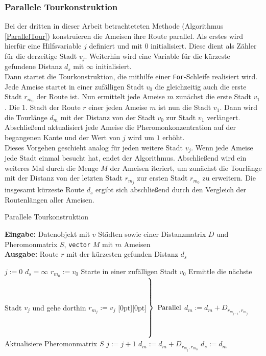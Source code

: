 \documentclass[doktyp=barbeit, sprache=german]{TUBAFarbeiten}
\begin{document}
\subsubsection{Parallele Tourkonstruktion}
Bei der dritten in dieser Arbeit betrachteteten Methode (Algorithmus \ref{ParallelTour}) konstruieren die Ameisen ihre Route parallel.
Als erstes wird hierfür eine Hilfsvariable $j$ definiert und mit $0$ initialisiert. Diese dient als Zähler für die derzeitige Stadt $v_j$. Weiterhin wird eine Variable für die kürzeste gefundene Distanz $d_s$ mit $\infty$ initialisiert. \\Dann startet die Tourkonstruktion, die mithilfe einer \texttt{For}-Schleife realisiert wird. Jede Ameise startet in einer zufälligen Stadt $v_0$ die gleichzeitig auch die erste Stadt $r_{m_0}$ der Route ist. Nun ermittelt jede Ameise $m$ zunächst die erste Stadt $v_1$. Die 1. Stadt der Route $r$ einer jeden Ameise $m$ ist nun die Stadt $v_1$. Dann wird die Tourlänge $d_m$ mit der Distanz von der Stadt $v_0$ zur Stadt $v_1$ verlängert. Abschließend aktualisiert jede Ameise die Pheromonkonzentration auf der begangenen Kante und der Wert von $j$ wird um $1$ erhöht.
\\Dieses Vorgehen geschieht analog für jeden weitere Stadt $v_j$. Wenn jede Ameise jede Stadt einmal besucht hat, endet der Algorithmus. Abschließend wird ein weiteres Mal durch die Menge $M$ der Ameisen iteriert, um zunächst die Tourlänge mit der Distanz von der letzten Stadt $r_{m_j}$ zur ersten Stadt $r_{m_0}$ zu erweitern. Die insgesamt kürzeste Route $d_s$ ergibt sich abschließend durch den Vergleich der Routenlängen aller Ameisen.
\begin{algorithm}
\caption{Parallele Tourkonstruktion}
\label{ParallelTour}
\textbf{Eingabe:} Datenobjekt mit $v$ Städten sowie einer Distanzmatrix $D$ und Pheromonmatrix $S$, \texttt{vector} $M$ mit $m$ Ameisen
\\\textbf{Ausgabe:} Route $r$ mit der kürzesten gefunden Distanz $d_s$
\begin{algorithmic}[1]
\State $j := 0$
\State $d_s = \infty$
\State $r_{m_0} := v_0$
\EndIf
\State Starte in einer zufälligen Stadt $v_0$
\State Ermittle die nächste Stadt $v_j$ und gehe dorthin
\State $r_{m_j} := v_j$
\hspace{17em}\raisebox{1.3\baselineskip}[0pt][0pt]{$\left.\rule{0pt}{3.8\baselineskip}\right\}\ \mbox{Parallel}$}
\State $d_m := d_m + D_{r_{m_{j-1}},r_{m_j}}$
\State Aktualisiere Pheromonmatrix $S$
\EndFor
\State $j := j + 1$
\EndWhile
{} 
\State $d_m := d_m + D_{r_{m_j},r_{m_0}}$
\State $d_s := d_m$
\EndIf
\EndFor
\end{algorithmic}
\end{algorithm}
\end{document}
